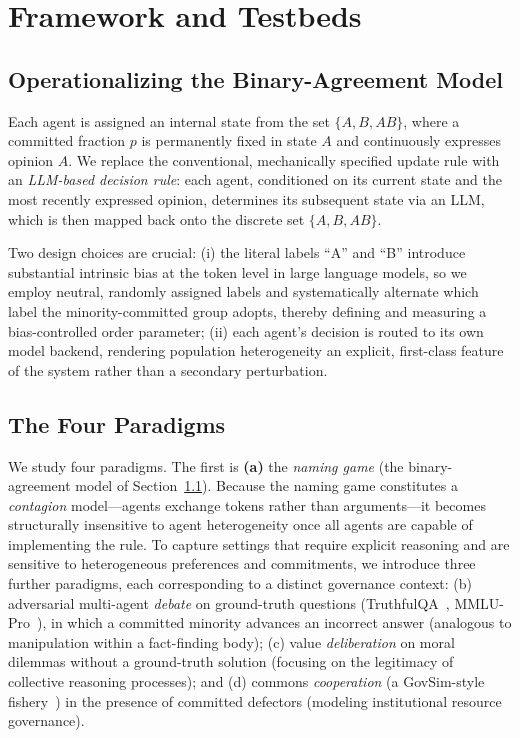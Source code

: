 \documentclass[manuscript,screen,review]{acmart}
\begin{document}
\section{Framework and Testbeds}
\subsection{Operationalizing the Binary-Agreement Model}
\label{sec:opmodel}
Each agent is assigned an internal state from the set $\{A, B, AB\}$, where a committed fraction $p$ is permanently fixed in state $A$ and continuously expresses opinion $A$. We replace the conventional, mechanically specified update rule with an \emph{LLM-based decision rule}: each agent, conditioned on its current state and the most recently expressed opinion, determines its subsequent state via an LLM, which is then mapped back onto the discrete set $\{A,B,AB\}$.

Two design choices are crucial: (i) the literal labels “A” and “B” introduce substantial intrinsic bias at the token level in large language models, so we employ neutral, randomly assigned labels and systematically alternate which label the minority-committed group adopts, thereby defining and measuring a bias-controlled order parameter; (ii) each agent’s decision is routed to its own model backend, rendering population heterogeneity an explicit, first-class feature of the system rather than a secondary perturbation.

\subsection{The Four Paradigms}
We study four paradigms. The first is \textbf{(a)} the \emph{naming game} (the binary-agreement model of Section~\ref{sec:opmodel}). Because the naming game constitutes a \emph{contagion} model—agents exchange tokens rather than arguments—it becomes structurally insensitive to agent heterogeneity once all agents are capable of implementing the rule. To capture settings that require explicit reasoning and are sensitive to heterogeneous preferences and commitments, we introduce three further paradigms, each corresponding to a distinct governance context: (b) adversarial multi-agent \emph{debate} on ground-truth questions (TruthfulQA~\cite{lin2022truthfulqa}, MMLU-Pro~\cite{wang2024mmlupro}), in which a committed minority advances an incorrect answer (analogous to manipulation within a fact-finding body); (c) value \emph{deliberation} on moral dilemmas without a ground-truth solution (focusing on the legitimacy of collective reasoning processes); and (d) commons \emph{cooperation} (a GovSim-style fishery~\cite{piatti2024}) in the presence of committed defectors (modeling institutional resource governance).
\end{document}
